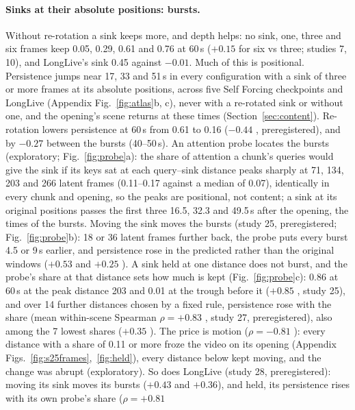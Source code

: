 \paragraph{Sinks at their absolute positions: bursts.} Without re-rotation a sink keeps more, and depth helps: no sink,
one, three and six frames keep 0.05, 0.29, 0.61 and 0.76 at 60\,s ($+0.15$  for six vs three; studies 7,
10), and LongLive's sink 0.45 against $-0.01$. Much of this is positional. Persistence jumps near 17, 33 and 51\,s in
every configuration with a sink of three or more frames at its absolute positions, across five Self Forcing checkpoints and LongLive (Appendix
Fig.~\ref{fig:atlas}b, c), never with a re-rotated sink or without one, and the opening's scene returns at these times
(Section~\ref{sec:content}). Re-rotation lowers persistence at 60\,s from 0.61 to 0.16 ($-0.44$ ,
preregistered), and by $-0.27$  between the bursts (40--50\,s). An attention probe locates the bursts
(exploratory; Fig.~\ref{fig:probe}a): the share of attention a chunk's queries would give the sink if its keys sat at
each query--sink distance peaks sharply at 71, 134, 203 and 266 latent frames (0.11--0.17 against a median of 0.07),
identically in every chunk and opening, so the peaks are positional, not content; a sink at its original
positions passes the first three 16.5, 32.3 and 49.5\,s after the opening, the times of the bursts. Moving the sink
moves the bursts (study 25, preregistered; Fig.~\ref{fig:probe}b): 18 or 36 latent frames further back, the probe puts
every burst 4.5 or 9\,s earlier, and persistence rose in the predicted rather than the original windows ($+0.53$
 and $+0.25$ ). A sink held at one
distance does not burst, and the probe's share at that distance sets how much is kept (Fig.~\ref{fig:probe}c): 0.86
at 60\,s at the peak distance 203 and 0.01 at the trough before it ($+0.85$ , study 25), and over 14
further distances chosen by a fixed rule, persistence rose with the share (mean within-scene Spearman $\rho=+0.83$ , study 27, preregistered),
also among the 7 lowest shares ($+0.35$ ). The price is motion ($\rho=-0.81$ ):
every distance with a share of 0.11 or more froze the video on its opening (Appendix Figs.~\ref{fig:s25frames},~\ref{fig:held}),
every distance below kept moving, and the change was abrupt (exploratory). So does LongLive (study 28, preregistered): moving its sink
moves its bursts ($+0.43$ and $+0.36$), and held, its persistence rises with its own probe's share ($\rho=+0.81$
